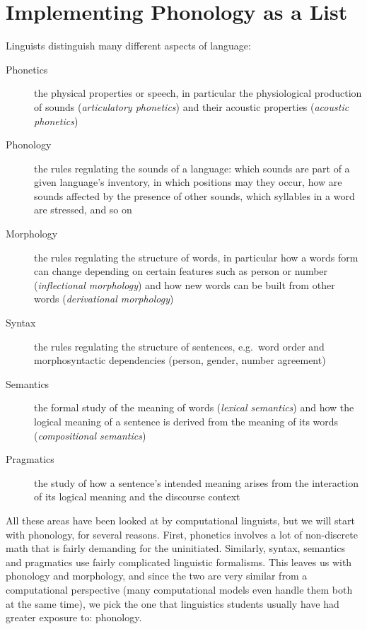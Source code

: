 \chapter{Implementing Phonology as a List}
\label{cha:ListPhonology}

Linguists distinguish many different aspects of language:
%
\begin{description}
    \item[Phonetics]
        the physical properties or speech, in particular the physiological production of sounds (\emph{articulatory phonetics}) and their acoustic properties (\emph{acoustic phonetics})
    \item[Phonology]
        the rules regulating the sounds of a language: which sounds are part of a given language's inventory, in which positions may they occur, how are sounds affected by the presence of other sounds, which syllables in a word are stressed, and so on
    \item[Morphology]
        the rules regulating the structure of words, in particular how a words form can change depending on certain features such as person or number (\emph{inflectional morphology}) and how new words can be built from other words (\emph{derivational morphology})
    \item[Syntax]
        the rules regulating the structure of sentences, e.g.\ word order and morphosyntactic dependencies (person, gender, number agreement)
    \item[Semantics]
        the formal study of the meaning of words (\emph{lexical semantics}) and how the logical meaning of a sentence is derived from the meaning of its words (\emph{compositional semantics})
    \item[Pragmatics]
        the study of how a sentence's intended meaning arises from the interaction of its logical meaning and the discourse context
\end{description}

All these areas have been looked at by computational linguists, but we will start with phonology, for several reasons.
First, phonetics involves a lot of non-discrete math that is fairly demanding for the uninitiated.
Similarly, syntax, semantics and pragmatics use fairly complicated linguistic formalisms.
This leaves us with phonology and morphology, and since the two are very similar from a computational perspective (many computational models even handle them both at the same time), we pick the one that linguistics students usually have had greater exposure to: phonology.


